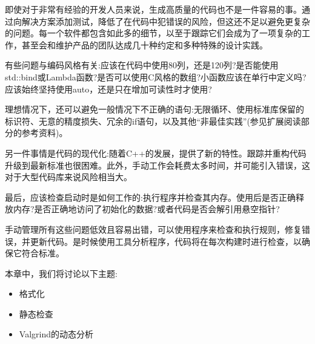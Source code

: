 即使对于非常有经验的开发人员来说，生成高质量的代码也不是一件容易的事。通过向解决方案添加测试，降低了在代码中犯错误的风险，但这还不足以避免更复杂的问题。每一个软件都包含如此多的细节，以至于跟踪它们会成为了一项复杂的工作，甚至会和维护产品的团队达成几十种约定和多种特殊的设计实践。

有些问题与编码风格有关:应该在代码中使用80列，还是120列?是否能使用std::bind或Lambda函数?是否可以使用C风格的数组?小函数应该在单行中定义吗?应该始终坚持使用auto，还是只在增加可读性时才使用?

理想情况下，还可以避免一般情况下不正确的语句:无限循环、使用标准库保留的标识符、无意的精度损失、冗余的if语句，以及其他“非最佳实践”(参见扩展阅读部分的参考资料)。

另一件事情是代码的现代化:随着C++的发展，提供了新的特性。跟踪并重构代码升级到最新标准也很困难。此外，手动工作会耗费太多时间，并可能引入错误，这对于大型代码库来说风险相当大。

最后，应该检查启动时是如何工作的:执行程序并检查其内存。使用后是否正确释放内存?是否正确地访问了初始化的数据?或者代码是否会解引用悬空指针?

手动管理所有这些问题低效且容易出错，可以使用程序来检查和执行规则，修复错误，并更新代码。是时候使用工具分析程序，代码将在每次构建时进行检查，以确保它符合标准。

本章中，我们将讨论以下主题:

\begin{itemize}
\item 
格式化

\item 
静态检查

\item 
Valgrind的动态分析
\end{itemize}













